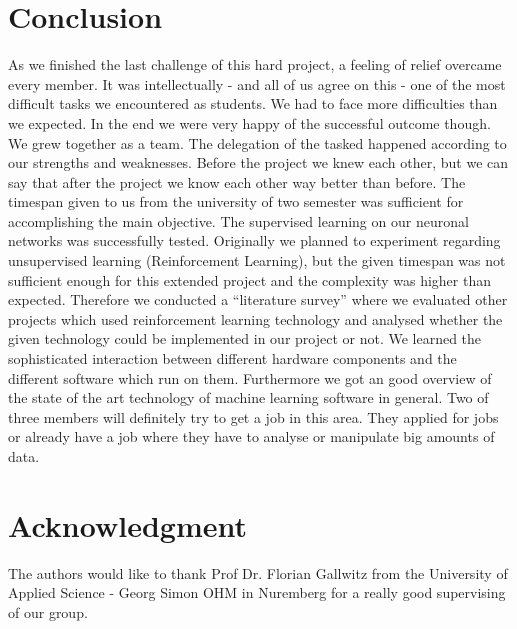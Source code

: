 \documentclass[journal]{IEEEtran}
\begin{document}
\section{Conclusion}
As we finished the last challenge of this hard project, a feeling of relief overcame every member. It was intellectually - and all of us agree on this - one of the most difficult tasks we encountered as students. We had to face more difficulties than we expected. In the end we were very happy of the successful outcome though.
We grew together as a team. The delegation of the tasked happened according to our strengths and weaknesses. Before the project we knew each other, but we can say that after the project we know each other way better than before.
The timespan given to us from the university of two semester was sufficient for accomplishing the main objective. The supervised learning on our neuronal networks was successfully tested. Originally we planned to experiment regarding unsupervised learning (Reinforcement Learning), but the given timespan was not sufficient enough for this extended project and the complexity was higher than expected. Therefore we conducted a “literature survey” where we evaluated other projects which used reinforcement learning technology and analysed whether the given technology could be implemented in our project or not. 
We learned the sophisticated interaction between different hardware components and the different software which run on them. Furthermore we got an good overview of the state of the art technology of machine learning software in general.
Two of three members will definitely try to get a job in this area. They applied for jobs or already have a job where they have to analyse or manipulate big amounts of data.

\section*{Acknowledgment}
\noindent The authors would like to thank Prof Dr. Florian Gallwitz from the University of Applied Science - Georg Simon OHM in Nuremberg for a really good supervising of our group. 



\end{document}
